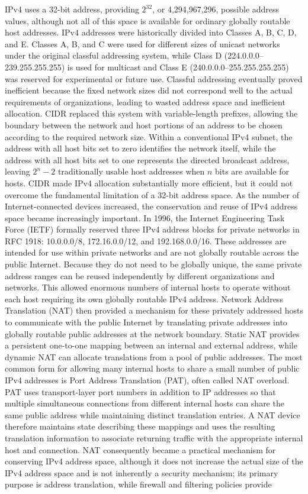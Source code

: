 \documentclass[12pt]{article}
\begin{document}
IPv4 uses a 32-bit address, providing $2^{32}$, or 4,294,967,296, possible address values, although not all of this space is available for ordinary globally routable host addresses. IPv4 addresses were historically divided into Classes A, B, C, D, and E. Classes A, B, and C were used for different sizes of unicast networks under the original classful addressing system, while Class D (224.0.0.0–239.255.255.255) is used for multicast and Class E (240.0.0.0–255.255.255.255) was reserved for experimental or future use. Classful addressing eventually proved inefficient because the fixed network sizes did not correspond well to the actual requirements of organizations, leading to wasted address space and inefficient allocation. CIDR replaced this system with variable-length prefixes, allowing the boundary between the network and host portions of an address to be chosen according to the required network size. Within a conventional IPv4 subnet, the address with all host bits set to zero identifies the network itself, while the address with all host bits set to one represents the directed broadcast address, leaving $2^n-2$ traditionally usable host addresses when $n$ bits are available for hosts. CIDR made IPv4 allocation substantially more efficient, but it could not overcome the fundamental limitation of a 32-bit address space. As the number of Internet-connected devices increased, the conservation and reuse of IPv4 address space became increasingly important. In 1996, the Internet Engineering Task Force (IETF) formally reserved three IPv4 address blocks for private networks in RFC 1918: 10.0.0.0/8, 172.16.0.0/12, and 192.168.0.0/16. These addresses are intended for use within private networks and are not globally routable across the public Internet. Because they do not need to be globally unique, the same private address ranges can be reused independently by different organizations and networks. This allowed enormous numbers of internal hosts to operate without each host requiring its own globally routable IPv4 address. Network Address Translation (NAT) then provided a mechanism for these privately addressed hosts to communicate with the public Internet by translating private addresses into globally routable public addresses at the network boundary. Static NAT provides a persistent one-to-one mapping between an internal and external address, while dynamic NAT can allocate translations from a pool of public addresses. The most common form for allowing many internal hosts to share a small number of public IPv4 addresses is Port Address Translation (PAT), often called NAT overload. PAT uses transport-layer port numbers in addition to IP addresses so that multiple simultaneous connections from different internal hosts can share the same public address while maintaining distinct translation entries. A NAT device therefore maintains state describing these mappings and uses the resulting translation information to associate returning traffic with the appropriate internal host and connection. NAT consequently became a practical mechanism for conserving IPv4 address space, although it does not increase the actual size of the IPv4 address space and is not inherently a security mechanism; its primary purpose is address translation, while firewall and filtering policies provide 
\end{document}
